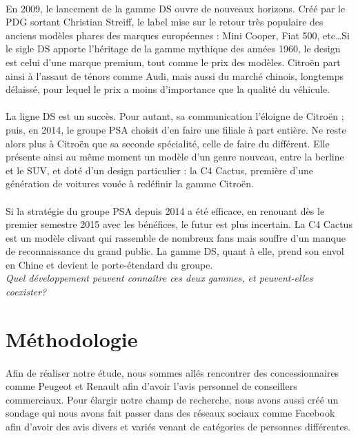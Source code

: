 \documentclass[12pt]{article}\usepackage[]{graphicx}\usepackage[]{color}
\begin{document}
\paragraph{} En 2009, le lancement de la gamme DS ouvre de nouveaux horizons.
Créé par le PDG sortant Christian Streiff, le label mise sur le retour très
populaire des anciens modèles phares des marques européennes : Mini Cooper,
Fiat 500, etc\ldots Si le sigle DS apporte l'héritage de la gamme mythique des
années 1960, le design est celui d'une marque premium, tout comme le prix des
modèles. Citroën part ainsi à l'assaut de ténors comme Audi, mais aussi du
marché chinois, longtemps délaissé, pour lequel le prix a moins d'importance
que la qualité du véhicule.

\paragraph{} La ligne DS est un succès. Pour autant, sa communication l'éloigne
de Citroën ; puis, en 2014, le groupe PSA choisit d'en faire une filiale à part
entière. Ne reste alors plus à Citroën que sa seconde spécialité, celle de
faire du différent. Elle présente ainsi au même moment un modèle d'un genre
nouveau, entre la berline et le SUV, et doté d'un design particulier : la C4
Cactus, première d'une génération de voitures vouée à redéfinir la gamme
Citroën.

\paragraph{} Si la stratégie du groupe PSA depuis 2014 a été efficace, en
renouant dès le premier semestre 2015 avec les bénéfices\cite{lesechos}, le
futur est plus incertain. La C4 Cactus est un modèle clivant qui rassemble de
nombreux fans mais souffre d'un manque de reconnaissance du grand public. La
gamme DS, quant à elle, prend son envol en Chine et devient le porte-étendard
du groupe.\\

\noindent \emph{Quel développement peuvent connaître ces deux gammes, et
	peuvent-elles coexister?}

\section{Méthodologie}

\paragraph{} Afin de réaliser notre étude, nous sommes allés rencontrer des
concessionnaires comme Peugeot et Renault afin d'avoir l'avis personnel de
conseillers commerciaux. Pour élargir notre champ de recherche, nous avons
aussi créé un sondage qui nous avons fait passer dans des réseaux sociaux comme
Facebook afin d'avoir des avis divers et variés venant de catégories de
personnes différentes.
\end{document}
